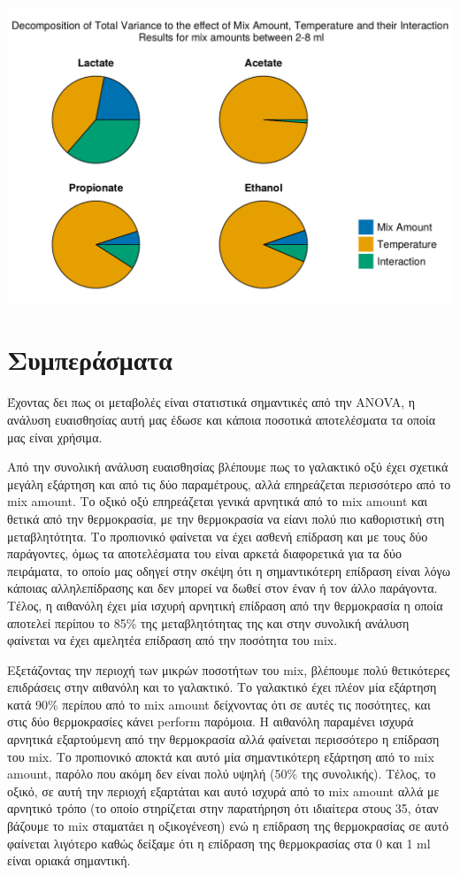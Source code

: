\documentclass[11pt]{article}
\begin{document}
\begin{center}
\includegraphics[width=.9\linewidth]{../plots/sensitivity/high_sobol.png}
\end{center}

\section{Συμπεράσματα}
\label{sec:org65f5981}
Έχοντας δει πως οι μεταβολές είναι στατιστικά σημαντικές από την ANOVA, η ανάλυση ευαισθησίας αυτή μας έδωσε και κάποια ποσοτικά αποτελέσματα τα οποία μας είναι χρήσιμα.

Από την συνολική ανάλυση ευαισθησίας βλέπουμε πως το γαλακτικό οξύ έχει σχετικά μεγάλη εξάρτηση και από τις δύο παραμέτρους, αλλά επηρεάζεται περισσότερο από το mix amount. Το οξικό οξύ επηρεάζεται γενικά αρνητικά από το mix amount και θετικά από την θερμοκρασία, με την θερμοκρασία να είανι πολύ πιο καθοριστική στη μεταβλητότητα. Το προπιονικό φαίνεται να έχει ασθενή επίδραση και με τους δύο παράγοντες, όμως τα αποτελέσματα του είναι αρκετά διαφορετικά για τα δύο πειράματα, το οποίο μας οδηγεί στην σκέψη ότι η σημαντικότερη επίδραση είναι λόγω κάποιας αλληλεπίδρασης και δεν μπορεί να δωθεί στον έναν ή τον άλλο παράγοντα. Τέλος, η αιθανόλη έχει μία ισχυρή αρνητική επίδραση από την θερμοκρασία η οποία αποτελεί περίπου το 85\% της μεταβλητότητας της και στην συνολική ανάλυση φαίνεται να έχει αμελητέα επίδραση από την ποσότητα του mix.

Εξετάζοντας την περιοχή των μικρών ποσοτήτων του mix, βλέπουμε πολύ θετικότερες επιδράσεις στην αιθανόλη και το γαλακτικό. Το γαλακτικό έχει πλέον μία εξάρτηση κατά 90\% περίπου από το mix amount δείχνοντας ότι σε αυτές τις ποσότητες, και στις δύο θερμοκρασίες κάνει perform παρόμοια. Η αιθανόλη παραμένει ισχυρά αρνητικά εξαρτούμενη από την θερμοκρασία αλλά φαίνεται περισσότερο η επίδραση του mix. Το προπιονικό αποκτά και αυτό μία σημαντικότερη εξάρτηση από το mix amount, παρόλο που ακόμη δεν είναι πολύ υψηλή (50\% της συνολικής). Τέλος, το οξικό, σε αυτή την περιοχή εξαρτάται και αυτό ισχυρά από το mix amount αλλά με αρνητικό τρόπο (το οποίο στηρίζεται στην παρατήρηση ότι ιδιαίτερα στους 35, όταν βάζουμε το mix σταματάει η οξικογένεση) ενώ η επίδραση της θερμοκρασίας σε αυτό φαίνεται λιγότερο καθώς δείξαμε ότι η επίδραση της θερμοκρασίας στα 0 και 1 ml είναι οριακά σημαντική.
\end{document}
